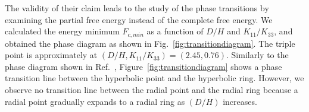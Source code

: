 \documentclass[nottitlepage]{article}
\begin{document}




The validity of their claim leads to the study of the phase transitions by examining the partial free energy instead of the complete free energy. We calculated the energy minimum $F_{c,min}$ as a function of $D/H$ and $K_{11}/K_{33}$, and obtained the phase diagram as shown in Fig.~\ref{fig:transitiondiagram}. The triple point is approximately at $(D/H, K_{11}/K_{33})=(2.45,0.76)$. Similarly to the phase diagram shown in Ref.~\cite{liang}, Figure~\ref{fig:transitiondiagram} shows a phase transition line between the hyperbolic point and the hyperbolic ring. %
However, we observe no transition line between the radial point and the radial ring because a radial point gradually expands to a radial ring as $(D/H)$ increases.
\end{document}
